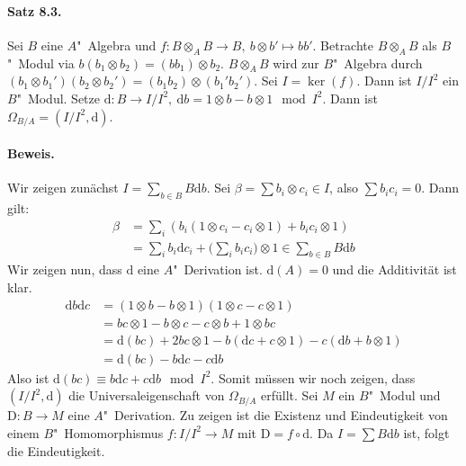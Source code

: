 \paragraph{Satz 8.3.}\label{8.3} Sei $B$ eine $A$"~Algebra und $f:B\otimes_A B\to B,\ b\otimes b'\mapsto bb'$. Betrachte $B\otimes_AB$ als $B$"~Modul via $b(b_1\otimes b_2)=(bb_1)\otimes b_2$. $B\otimes_A B$ wird zur $B$"~Algebra durch $(b_1\otimes b_1')(b_2\otimes b_2')=(b_1b_2)\otimes (b_1'b_2')$. Sei $I=\ker(f)$. Dann ist $I/I^2$ ein $B$"~Modul. Setze $\mathrm{d}:B\to I/I^2,\ \mathrm{d}b=1\otimes b-b\otimes 1\mod I^2$. Dann ist $\Omega_{B/A}= (I/I^2,\mathrm{d})$.

\paragraph{Beweis.} Wir zeigen zunächst $I=\sum_{b\in B}B\mathrm{d}b$. Sei $\beta=\sum b_i\otimes c_i\in I$, also $\sum b_ic_i=0$. Dann gilt:
\begin{align*}
\beta &= \sum_i (b_i(1\otimes c_i-c_i\otimes 1) + b_ic_i\otimes 1)\\
&= \sum_i b_i \mathrm{d}c_i + \Big(\sum_i b_ic_i\Big)\otimes 1 \in\sum_{b\in B} B\mathrm{d}b
\end{align*}
Wir zeigen nun, dass $\mathrm{d}$ eine $A$"~Derivation ist. $\mathrm{d}(A)=0$ und die Additivität ist klar.
\begin{align*}
\mathrm{d}b\mathrm{d}c &= (1\otimes b- b\otimes 1)(1\otimes c-c\otimes 1)\\
&= bc\otimes 1 - b\otimes c- c\otimes b+1\otimes bc\\
&=\mathrm{d}(bc) + 2bc\otimes 1- b(\mathrm{d}c+c\otimes 1) - c (\mathrm{d}b + b\otimes 1)\\
&=\mathrm{d}(bc)-b\mathrm{d}c - c \mathrm{d}b
\end{align*}
Also ist $\mathrm{d}(bc)\equiv b\mathrm{d}c+c\mathrm{d}b\mod I^2$. Somit müssen wir noch zeigen, dass $(I/I^2,\mathrm{d})$ die Universaleigenschaft von $\Omega_{B/A}$ erfüllt. Sei $M$ ein $B$"~Modul und $\mathrm{D}:B\to M$ eine $A$"~Derivation. Zu zeigen ist die Existenz und Eindeutigkeit von einem $B$"~Homomorphismus $f:I/I^2\to M$ mit $\mathrm{D}=f\circ \mathrm{d}$. Da $I=\sum B\mathrm{d}b$ ist, folgt die Eindeutigkeit.


